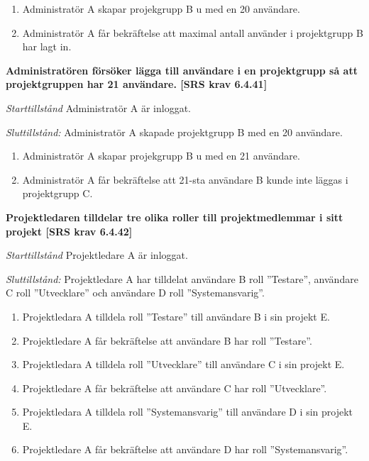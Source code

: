 \documentclass[a4paper]{article}
\begin{document}
\begin{FT}
\begin{enumerate}
\item Administratör A skapar projekgrupp B u med en 20  användare.
\item Administratör A får bekräftelse att maximal antall använder i projektgrupp B  har lagt in.
\end{enumerate}

\item %
\textbf{Administratören försöker lägga till användare i en projektgrupp så att projektgruppen har 21 användare. [SRS krav 6.4.41]}

\emph{Starttillstånd} Administratör A är inloggat.

\emph{Sluttillstånd:} Administratör A  skapade  projektgrupp B med en 20  användare.

\begin{enumerate}
\item Administratör A skapar projekgrupp B u med en 21  användare.
\item Administratör A får bekräftelse att 21-sta användare B kunde inte läggas i projektgrupp C.
\end{enumerate}

\item %
\textbf{Projektledaren tilldelar tre olika roller till projektmedlemmar i sitt projekt [SRS krav 6.4.42]}

\emph{Starttillstånd} Projektledare A är inloggat.

\emph{Sluttillstånd:} Projektledare A  har tilldelat användare B roll ”Testare”, användare C roll ”Utvecklare” och användare D roll ”Systemansvarig”.

\begin{enumerate}
\item Projektledara A tilldela roll ”Testare” till användare B i sin projekt E.
\item Projektledare A får bekräftelse att användare B har roll ”Testare”.
\item Projektledara A tilldela roll ”Utvecklare” till användare C i sin projekt E.
\item Projektledare A får bekräftelse att användare C har roll ”Utvecklare”.
\item Projektledara A tilldela roll ”Systemansvarig” till användare D i sin projekt E.
\item Projektledare A får bekräftelse att användare D har roll ”Systemansvarig”.
\end{enumerate}


\end{FT}
\end{document}
